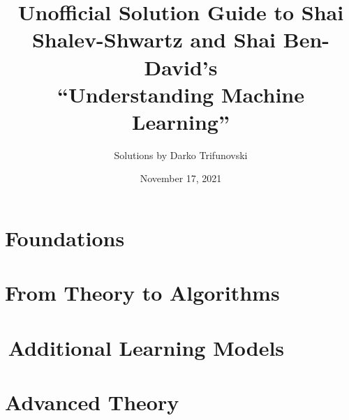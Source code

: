 \documentclass[oneside]{memoir}
\title{Unofficial Solution Guide to Shai Shalev-Shwartz and Shai Ben-David's\\
      ``Understanding Machine Learning''}
\author{Solutions by Darko Trifunovski}
\date{November 17, 2021}
\theoremstyle{definition}
\begin{document}
\frontmatter
\begin{titlingpage}
  \maketitle
\end{titlingpage}
\tableofcontents

\mainmatter
\setcounter{chapter}{1}
\part{Foundations}








\part{From Theory to Algorithms}













\part{\,Additional Learning Models}






\part{Advanced Theory}
\setcounter{chapter}{28}

\setcounter{chapter}{30}

\end{document}
